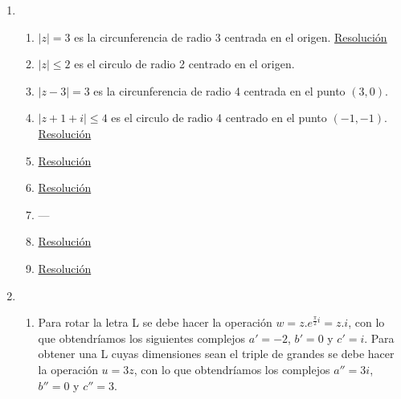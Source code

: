 \documentclass[a4paper]{article}
\newcommand{\exercise}{\item}
\newcommand{\df}[2]{\displaystyle\frac{#1}{#2}}
\begin{document}
\begin{enumerate}
\begin{enumerate} [label=(\alph*)]
		\item $z=-\df{1}{2}-i$
		\item $z=2+i$ y $z=-3+i$
		\item \href{https://youtu.be/plpDsgzooH4}{Resolución}
		\item $z^5-1=0$
		\item \href{https://youtu.be/8z_3vpIabLI}{Resolución}
		\item $z \in \{2,-2,2i,-2i\}$
		\item \href{https://youtu.be/7ggnxlrUnrk}{Resolución}
		\item Dado $z=a+bi$ la primera condición implica que $a+bi+a-bi=2a=4$, es decir, $a=2$. Sabiendo que $z=2+bi$ aplicamos la segunda condición $|z|=\sqrt{2^2+b^2}=3$, de lo que se puede despejar que $b=\pm\sqrt(5)$. Los números complejos posibles son $z=2+\sqrt{5}i$ y $z=2-\sqrt{5}i$.
		\item Aplicando Bhaskara obtenemos $z_{1,2}=\df{-4i\pm\sqrt{(4i)^2-4.1.(-8)}}{2.1}=-2i\pm2$
		\item Aplicamos Bhaskara considerando solo la raíz positiva $z_{1,2}=\df{(3+i)+\sqrt{(-3-i)^2-4.1.(2+1)}}{2.1}=\df{3+i+\sqrt{-2i}}{2}$. Calculamos las raíces cuadradas de $-2i$ con la fórmula de Moivre y obtenemos $-1+i$ y $1-i$. Reemplazamos cada raíz en la fórmula de Bhaskara y obtenemos $z_1=\df{3+i-1+i}{2}=1+i$ y $z_1=\df{3+i+1-i}{2}=2$.
\end{enumerate}\exercise\begin{enumerate} [label=(\alph*)]		\item $|z|=3$ es la circunferencia de radio 3 centrada en el origen. \href{https://youtu.be/AQVEp9ncSwQ}{Resolución}
		\item $|z|\leq 2$ es el circulo de radio 2 centrado en el origen.
		\item $|z-3| = 3$ es la circunferencia de radio 4 centrada en el punto $(3,0)$.
		\item $|z+1+i| \leq 4$ es el circulo de radio 4 centrado en el punto $(-1,-1)$. \href{https://youtu.be/Rj6VfY1fLzw}{Resolución}
		\item \href{https://youtu.be/5OHpMCsd8iE}{Resolución}
		\item \href{https://youtu.be/OhXOvWcryMI}{Resolución}
\item ---		\item \href{https://youtu.be/9pxsYXL6k88}{Resolución}
		\item \href{https://youtu.be/3m1ZDSuXsX8}{Resolución}
\end{enumerate}\exercise\begin{enumerate} [label=(\alph*)]		\item Para rotar la letra L se debe hacer la operación $w=z.e^{\frac{\pi}{2}i}=z.i$, con lo que obtendríamos los siguientes complejos $a'=-2$, $b'=0$ y $c'=i$. Para obtener una L cuyas dimensiones sean el triple de grandes se debe hacer la operación $u=3z$, con lo que obtendríamos los complejos $a''=3i$, $b''=0$ y $c''=3$. 

\end{enumerate}
\end{enumerate}
\end{document}

